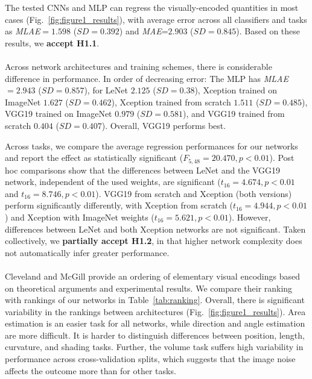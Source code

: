 The tested CNNs and MLP can regress the visually-encoded quantities in most cases (Fig.~\ref{fig:figure1_results}), with average error across all classifiers and tasks as \textit{MLAE}$=1.598$ ($SD=0.392$) and \textit{MAE}=$2.903$ ($SD=0.845$). 
Based on these results, we \textbf{accept H1.1}.
\\~\\
Across network architectures and training schemes, there is considerable difference in performance. In order of decreasing error: 
The MLP has \textit{MLAE}$=2.943$ ($SD=0.857$), 
for LeNet $2.125$ ($SD=0.38$), 
Xception trained on ImageNet $1.627$ ($SD=0.462$), 
Xception trained from scratch $1.511$ ($SD=0.485$),
VGG19 trained on ImageNet $0.979$ ($SD=0.581$), 
and VGG19 trained from scratch $0.404$ ($SD=0.407$). Overall, VGG19 performs best.

Across tasks, we compare the average regression performances for our networks and report the effect as statistically significant ($F_{5,48}=20.470,p<0.01$). Post hoc comparisons show that the differences between LeNet and the VGG19 network, independent of the used weights, are significant ($t_{16}=4.674,p<0.01$ and $t_{16}=8.746,p<0.01$). VGG19 from scratch and Xception (both versions) perform significantly differently, with Xception from scratch ($t_{16}=4.944,p<0.01$) and Xception with ImageNet weights ($t_{16}=5.621,p<0.01$). However, differences between LeNet and both Xception networks are not significant. Taken collectively, we \textbf{partially accept H1.2}, in that higher network complexity does not automatically infer greater performance.
\\~\\
 Cleveland and McGill provide an ordering of elementary visual encodings based on theoretical arguments and experimental results. We compare their ranking with rankings of our networks in Table~\ref{tab:ranking}. Overall, there is significant variability in the rankings between architectures (Fig.~\ref{fig:figure1_results}). Area estimation is an easier task for all networks, while direction and angle estimation are more difficult. It is harder to distinguish differences between position, length, curvature, and shading tasks. Further, the volume task suffers high variability in performance across cross-validation splits, which suggests that the image noise affects the outcome more than for other tasks. 

